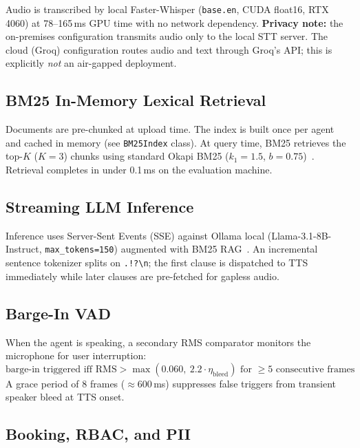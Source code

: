 \documentclass[journal]{IEEEtran}
\begin{document}
Audio is transcribed by local Faster-Whisper (\texttt{base.en},
CUDA float16, RTX 4060) at 78--165\,ms GPU time with no network
dependency. \textbf{Privacy note:} the on-premises configuration
transmits audio only to the local STT server. The cloud (Groq) configuration
routes audio and text through Groq's API; this is explicitly \emph{not}
an air-gapped deployment.

\subsection{BM25 In-Memory Lexical Retrieval}

Documents are pre-chunked at upload time. The index is built once per agent
and cached in memory (see \texttt{BM25Index} class). At query time, BM25
retrieves the top-$K$ ($K{=}3$) chunks using standard Okapi BM25
($k_1{=}1.5$, $b{=}0.75$)~\cite{robertson2009}. Retrieval completes in
under 0.1\,ms on the evaluation machine.

\subsection{Streaming LLM Inference}

Inference uses Server-Sent Events (SSE) against Ollama local
(Llama-3.1-8B-Instruct, \texttt{max\_tokens=150}) augmented with BM25 RAG~\cite{lewis2020}. An incremental sentence
tokenizer splits on \texttt{.!?\textbackslash n}; the first clause is
dispatched to TTS immediately while later clauses are pre-fetched for
gapless audio.

\subsection{Barge-In VAD}

When the agent is speaking, a secondary RMS comparator monitors the
microphone for user interruption:
\begin{equation}
\text{barge-in triggered iff } \text{RMS} > \max(0.060,\ 2.2 \cdot \eta_\text{bleed})
\text{ for } \geq 5 \text{ consecutive frames}
\end{equation}
A grace period of 8 frames (${\approx}600$\,ms) suppresses false triggers
from transient speaker bleed at TTS onset.

\subsection{Booking, RBAC, and PII}
\end{document}
